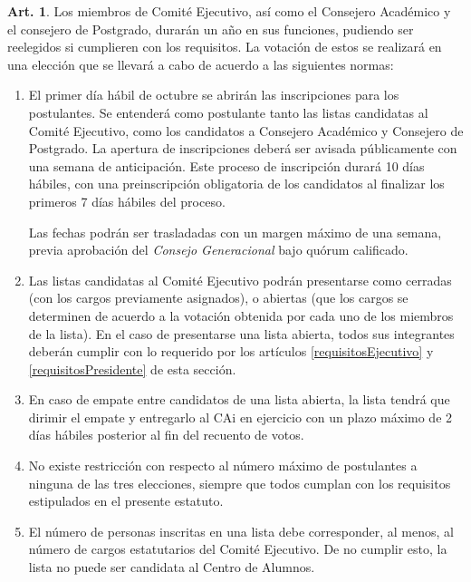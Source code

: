 \documentclass[letterpaper,11pt]{article}
\theoremstyle{definition}%
\newtheorem{art}{Art.} %
\begin{document}
\begin{art}\label{eleccionesCAi}
	Los miembros de Comité Ejecutivo, así como el Consejero Académico y el consejero de Postgrado, durarán un año en sus funciones, pudiendo ser reelegidos si cumplieren con los requisitos. La votación de estos se realizará en una elección que se llevará a cabo de acuerdo a las siguientes normas:
	\begin{enumerate}
		\item El primer día hábil de octubre se abrirán las inscripciones para los postulantes. Se entenderá como postulante tanto las listas candidatas al Comité Ejecutivo, como los candidatos a Consejero Académico y Consejero de Postgrado. La apertura de inscripciones deberá ser avisada públicamente con una semana de anticipación. Este proceso de inscripción durará 10 días hábiles, con una preinscripción obligatoria de los candidatos al finalizar los primeros 7 días hábiles del proceso.

		      Las fechas podrán ser trasladadas con un margen máximo de una semana, previa aprobación del \emph{Consejo Generacional} bajo quórum calificado.

		\item Las listas candidatas al Comité Ejecutivo podrán presentarse como cerradas (con los cargos previamente asignados), o abiertas (que los cargos se determinen de acuerdo a la votación obtenida por cada uno de los miembros de la lista). En el caso de presentarse una lista abierta, todos sus integrantes deberán cumplir con lo requerido por los artículos \ref{requisitosEjecutivo} y \ref{requisitosPresidente} de esta sección.

		\item En caso de empate entre candidatos de una lista abierta, la lista tendrá que dirimir el empate y entregarlo al CAi en ejercicio con un plazo máximo de 2 días hábiles posterior al fin del recuento de votos.

		\item No existe restricción con respecto al número máximo de postulantes a ninguna de las tres elecciones, siempre que todos cumplan con los requisitos estipulados en el presente estatuto.

		\item El número de personas inscritas en una lista debe corresponder, al menos, al número de cargos estatutarios del Comité Ejecutivo. De no cumplir esto, la lista no puede ser candidata al Centro de Alumnos.


\end{enumerate}
\end{art}
\end{document}
